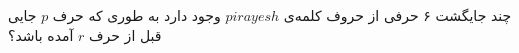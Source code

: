 \p
چند جایگشت ۶ حرفی از حروف کلمه‌ی $pirayesh$
وجود دارد به طوری که 
حرف $p$ 
جایی قبل از حرف $r$ 
آمده باشد؟